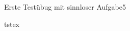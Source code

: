 \documentclass[
	ausgabe=heute,
	rückgabe=gestern,
	solution,
	blatt=5,
]{lcourse-hd}
\begin{document}
\begin{exercise}[abgabe=per Gedankenübertragung]{Erste Testübug mit sinnloser Aufgabe}{5}


\begin{solution}
tstex

\end{solution}
\end{exercise}
\end{document}
